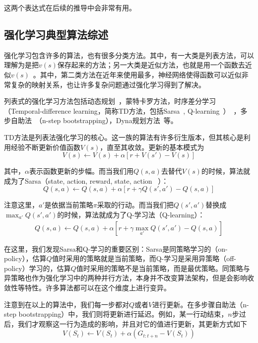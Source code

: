     \par 这两个表达式在后续的推导中会非常有用。
    
  \subsection{强化学习典型算法综述}
      强化学习包含许多的算法，也有很多分类方法。其中，有一大类是列表方法，可以理解为是把$v(s)$保存起来的方法；另一大类是近似方法，也就是用一个函数去近似$v(s)$~\cite{Sutton_book}。其中，第二类方法在近年来使用最多，神经网络使得函数可以近似非常复杂的映射关系，也让许多复杂问题通过强化学习得到了解决。\par
      列表式的强化学习方法包括动态规划~\cite{Bellman_DP}，蒙特卡罗方法，时序差分学习（Temporal-difference learning，简称TD方法，包括Sarsa~\cite{Sutton_book}, Q-learning~\cite{Q_learning}）~\cite{Sutton_problem_formulation}，多步自助法~\cite{n_step_bootstrapping}（n-step bootstrapping），Dyna规划方法~\cite{Sutton_book}等。\par
      TD方法是列表法强化学习的核心。这一族的算法有许多衍生版本，但其核心是利用经验不断更新价值函数$V(s)$，直至其收敛。更新的基本模式为
      $$ V(s) \gets V(s) + \alpha [r + V(s') - V(s)] $$
      \par 其中，$\alpha$表示函数更新的步幅。而当我们用$Q(s, a)$去替代$V(s)$的时候，算法就成为了Sarsa（state, action, reward, state, action ~\cite{deepRL_overview}）：
      $$ Q(s, a) \gets Q(s, a) + \alpha [r + \gamma Q(s', a') - Q(s, a)] $$
      \par 注意这里，$a'$是依据当前策略$\pi$采取的行动。而当我们把$Q(s', a')$替换成$\max_{a'} Q(s', a')$的时候，算法就成为了Q-学习法（Q-learning）：
      \begin{align}
      \label{eq:Q_learning}
        Q(s, a) \gets Q(s, a) + \alpha [r + \gamma \max_{a'} Q(s', a') - Q(s, a)]
      \end{align}
      \par 在这里，我们发现Sarsa和Q-学习的重要区别：Sarsa是同策略学习的（on-policy），估算$Q$值时采用的策略就是当前策略，而Q-学习是采用异策略（off-policy）学习的，估算$Q$值时采用的策略不是当前策略，而是最优策略。同策略与异策略也作为强化学习中的两种并行方法，本身并不改变算法架构，但是会影响收敛性等特性。许多算法都可以在这个维度上进行变异。\par
      注意到在以上的算法中，我们每一步都对$Q$或者$V$进行更新。在多步骤自助法（n-step bootstrapping）中，我们则将更新进行延迟。例如，某一行动结束，$n$步过后，我们才观察这一行为造成的影响，并且对它的值进行更新，其更新方式如下
      $$ V(S_t) \gets V(S_t) + \alpha(G_{t:t+n} - V(S_t)) $$
